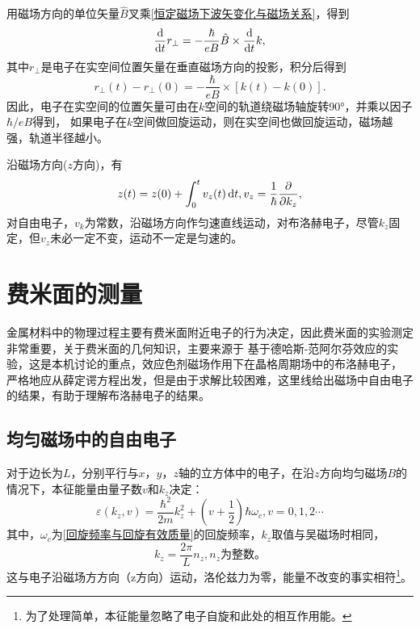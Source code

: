             用磁场方向的单位矢量$\hat{B}$叉乘\autoref{恒定磁场下波矢变化与磁场关系}，得到
            \begin{equation}
                \frac{\mathop{}\!\mathrm{d}}{\mathop{}\!\mathrm{d} t}r_\perp=-\frac{\hbar}{eB}\hat{B}\times\frac{\mathop{}\!\mathrm{d} }{\mathop{}\!\mathrm{d} t}k,
            \end{equation}
            其中$r_\perp$是电子在实空间位置矢量在垂直磁场方向的投影，积分后得到
            \begin{equation}
                r_\perp(t)-r_\perp(0)=-\frac{\hbar}{eB}\times[k(t)-k(0)]\label{磁场中位移矢量随时间变化情况}.
            \end{equation}
            因此，电子在实空间的位置矢量可由在$k$空间的轨道绕磁场轴旋转\ang{90}，并乘以因子$\hbar/eB$得到，
            如果电子在$k$空间做回旋运动，则在实空间也做回旋运动，磁场越强，轨道半径越小。

            沿磁场方向($z$方向)，有
            \begin{equation}
                z(t)=z(0)+\int_{0}^{t}v_z(t)\mathop{}\!\mathrm{d} t, v_z=\frac{1}{\hbar}\frac{\partial}{\partial k_z},
            \end{equation}
            对自由电子，$v_k$为常数，沿磁场方向作匀速直线运动，对布洛赫电子，尽管$k_z$固定，但$v_z$未必一定不变，运动不一定是匀速的。
        
    \section{费米面的测量}
        金属材料中的物理过程主要有费米面附近电子的行为决定，因此费米面的实验测定非常重要，关于费米面的几何知识，主要来源于
        基于德哈斯-范阿尔芬效应的实验，这是本机讨论的重点，效应色剂磁场作用下在晶格周期场中的布洛赫电子，
        严格地应从薛定谔方程出发，但是由于求解比较困难，这里线给出磁场中自由电子的结果，有助于理解布洛赫电子的结果。
        \subsection{均匀磁场中的自由电子}
            对于边长为$L$，分别平行与$x$，$y$，$z$轴的立方体中的电子，在沿$z$方向均匀磁场$B$的情况下，本征能量由量子数$v$和$k_z$决定：
            \begin{equation}
                \varepsilon(k_z,v)=\frac{\hbar^2}{2m}k_z^2+\left( v+\frac{1}{2} \right)\hbar\omega_c, v=0,1,2\cdots\label{均匀磁场下电子运动的本征值}
            \end{equation}
            其中，$\omega_c$为\autoref{回旋频率与回旋有效质量}的回旋频率，$k_z$取值与吴磁场时相同，
            \begin{equation}
                k_z=\frac{2\pi}{L}n_z, n_z\text{为整数。}
            \end{equation}
            这与电子沿磁场方方向（z方向）运动，洛伦兹力为零，能量不改变的事实相符\footnote{为了处理简单，本征能量忽略了电子自旋和此处的相互作用能。}。

